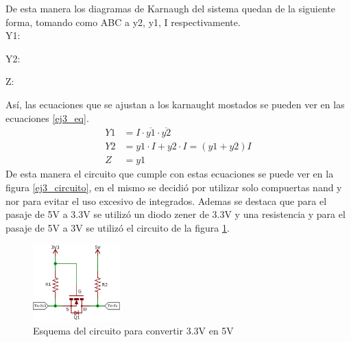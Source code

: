 %
De esta manera los diagramas de Karnaugh del sistema quedan de la siguiente forma, tomando como ABC a y2, y1, I respectivamente.\\
%
Y1:
%
\begin{center}
    \begin{Karnaughvuit}
    \end{Karnaughvuit}
\end{center}
%
Y2:
%
\begin{center}
    \begin{Karnaughvuit}
    \end{Karnaughvuit}
\end{center}
%
Z:
%
\begin{center}
    \begin{Karnaughquatre}
    \end{Karnaughquatre}
\end{center}
%
Así, las ecuaciones que se ajustan a los karnaught mostados se pueden ver en las ecuaciones \ref{ej3_eq}.
%
\begin{equation}
\begin{split}
    Y1&=I \cdot \overline{y1} \cdot \overline{y2}\\
    Y2&=y1 \cdot I+y2 \cdot I = (y1 + y2) I\\
    Z&=y1
\label{ej3_eq}
\end{split}
\end{equation}
%
De esta manera el circuito que cumple con estas ecuaciones se puede ver en la figura \ref{ej3_circuito}, en el mismo se decidió por utilizar solo compuertas nand y nor para evitar el uso excesivo de integrados. Ademas se destaca que para el pasaje de 5V a 3.3V se utilizó un diodo zener de 3.3V y una resistencia y para el pasaje de 5V a 3V se utilizó el circuito de la figura \ref{ej3_fig_5v}.
%
\begin{figure}[H]
    \centering
    \includegraphics[width=0.3\textwidth]{figs/Ej3/shifter.JPG} %
        \caption{Esquema del circuito para convertir 3.3V en 5V}
    \label{ej3_fig_5v}
\end{figure}

